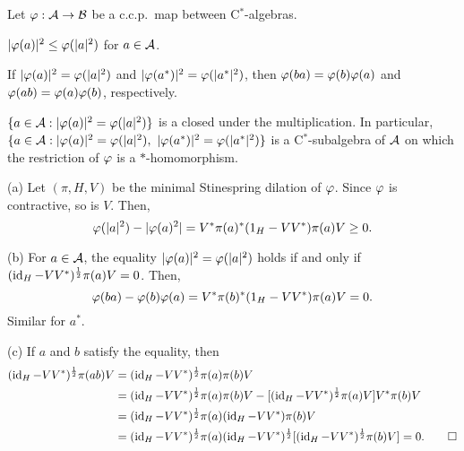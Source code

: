 \documentclass{../../small}
\begin{document}
\begin{prop}
Let $\varphi:\mathcal{A}\to\mathcal{B}$ be a c.c.p.~map between C$^*$-algebras.
\begin{parts}
\item $|\varphi(a)|^2\le\varphi(|a|^2)$ for $a\in\mathcal{A}$.
\item If $|\varphi(a)|^2=\varphi(|a|^2)$ and $|\varphi(a^*)|^2=\varphi(|a^*|^2)$, then $\varphi(ba)=\varphi(b)\varphi(a)$ and $\varphi(ab)=\varphi(a)\varphi(b)$, respectively.
\item $\{a\in\mathcal{A}:|\varphi(a)|^2=\varphi(|a|^2)\}$ is a closed under the multiplication.
In particular, $\{a\in\cA:|\f(a)|^2=\f(|a|^2),\ |\f(a^*)|^2=\f(|a^*|^2)\}$ is a C$^*$-subalgebra of $\mathcal{A}$ on which the restriction of $\varphi$ is a $*$-homomorphism.
\end{parts}
\end{prop}
\begin{pf}
(a)
Let $(\pi,H,V)$ be the minimal Stinespring dilation of $\varphi$.
Since $\varphi$ is contractive, so is $V$.
Then,
\[\varphi(|a|^2)-|\varphi(a)^2|=V^*\pi(a)^*(1_H-VV^*)\pi(a)V\ge0.\]

(b)
For $a\in\mathcal{A}$, the equality $|\varphi(a)|^2=\varphi(|a|^2)$ holds if and only if $(\operatorname{id}_H-VV^*)^{\frac12}\pi(a)V=0$.
Then,
\[\varphi(ba)-\varphi(b)\varphi(a)=V^*\pi(b)^*(1_H-VV^*)\pi(a)V=0.\]
Similar for $a^*$.

(c)
If $a$ and $b$ satisfy the equality, then
\begin{align*}
(\operatorname{id}_H-VV^*)^{\frac12}\pi(ab)V
&=(\operatorname{id}_H-VV^*)^{\frac12}\pi(a)\pi(b)V\\
&=(\operatorname{id}_H-VV^*)^{\frac12}\pi(a)\pi(b)V-[(\operatorname{id}_H-VV^*)^{\frac12}\pi(a)V]V^*\pi(b)V\\
&=(\operatorname{id}_H-VV^*)^{\frac12}\pi(a)(\operatorname{id}_H-VV^*)\pi(b)V\\
&=(\operatorname{id}_H-VV^*)^{\frac12}\pi(a)(\operatorname{id}_H-VV^*)^{\frac12}[(\operatorname{id}_H-VV^*)^{\frac12}\pi(b)V]=0.\qedhere
\end{align*}
\end{pf}
\end{document}
